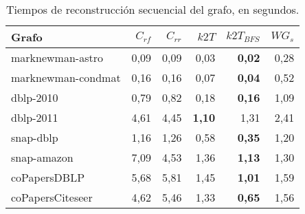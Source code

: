 \begin{table}
	\caption{Tiempos de reconstrucción secuencial del grafo, en segundos.}
	\label{table:timesSecuencial}
	\centering
	\begin{tabular}{l|r|r|r|r|r}
		\toprule
		Grafo & $C_{rf}$ & $C_{rr}$ & $k2T$ & $k2T_{BFS}$ & $WG_{s}$ \\
        \midrule
        marknewman-astro & 0,09 & 0,09 & 0,03 & \textbf{0,02} & 0,28 \\
        marknewman-condmat & 0,16 & 0,16 & 0,07 & \textbf{0,04} & 0,52 \\
        dblp-2010 & 0,79 & 0,82 & 0,18 & \textbf{0,16} & 1,09 \\
        dblp-2011 & 4,61 & 4,45 & \textbf{1,10} & 1,31 & 2,41 \\
        snap-dblp & 1,16 & 1,26 & 0,58 & \textbf{0,35} & 1,20 \\
        snap-amazon & 7,09 & 4,53 & 1,36 & \textbf{1,13} & 1,30 \\
        coPapersDBLP & 5,68 & 5,81 & 1,45 & \textbf{1,01} & 1,59 \\
        coPapersCiteseer & 4,62 & 5,46 & 1,33 & \textbf{0,65} & 1,56 \\
        \bottomrule
	\end{tabular}
\end{table}

